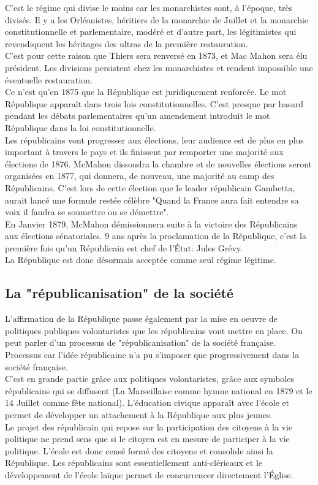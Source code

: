 \documentclass[10pt, a4paper, openany]{book}
\begin{document}
C'est le régime qui divise le moins car les monarchistes sont, à l'époque, très divisés. Il y a les Orléanistes, héritiers de la monarchie de Juillet et la monarchie constitutionnelle et parlementaire, modéré et d'autre part, les légitimistes qui revendiquent les héritages des ultras de la première restauration. \\
C'est pour cette raison que Thiers sera renversé en 1873, et Mac Mahon sera élu président. Les divisions persistent chez les monarchistes et rendent impossible une éventuelle restauration. \\
Ce n'est qu'en 1875 que la République est juridiquement renforcée. Le mot République apparaît dans trois lois constitutionnelles. C'est presque par hasard pendant les débats parlementaires qu'un amendement introduit le mot République dans la loi constitutionnelle. \\
Les républicains vont progresser aux élections, leur audience est de plus en plus important à travers le pays et ils finissent par remporter une majorité aux élections de 1876. McMahon dissoudra la chambre et de nouvelles élections seront organisées en 1877, qui donnera, de nouveau, une majorité au camp des Républicains. C'est lors de cette élection que le leader républicain Gambetta, aurait lancé une formule restée célèbre "Quand la France aura fait entendre sa voix il faudra se soumettre ou se démettre". \\
En Janvier  1879, McMahon démissionnera suite à la victoire des Républicains aux élections sénatoriales. 9 ans après la proclamation de la République, c'est la première fois qu'un Républicain est chef de l'État: Jules Grévy. \\
La République est donc désormais acceptée comme seul régime légitime. 

\subsection{La "républicanisation" de la société}

L'affirmation de la République passe également par la mise en oeuvre de politiques publiques volontaristes que les républicains vont mettre en place. On peut parler d'un processus de "républicanisation" de la société française. Processus car l'idée républicaine n'a pu s'imposer que progressivement dans la société française. \\
C'est en grande partie grâce aux politiques volontaristes, grâce aux symboles républicains qui se diffusent (La Marseillaise comme hymne national en 1879 et le 14 Juillet comme fête national). L'éducation civique apparaît avec l'école et permet de développer un attachement à la République aux plus jeunes. \\
Le projet des républicain qui repose sur la participation des citoyens à la vie politique ne prend sens que si le citoyen est en mesure de participer à la vie politique. L'école est donc censé formé des citoyens et consolide ainsi la République. Les républicains sont essentiellement anti-cléricaux et le développement de l'école laïque permet de concurrencer directement l'Église. 
\end{document}
